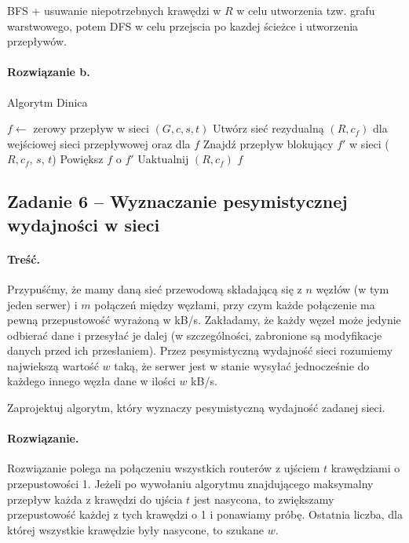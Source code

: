 BFS + usuwanie niepotrzebnych krawędzi w $R$ w celu utworzenia tzw. 
grafu warstwowego, potem DFS w celu przejscia po kazdej ścieżce
i utworzenia przepływów.

\paragraph{Rozwiązanie b.}

\begin{algorithm}[H]
	\caption{Algorytm Dinica}
	\begin{algorithmic}[1]
		\State $f \gets$ zerowy przepływ w sieci $(G,c,s,t)$
		\State Utwórz sieć rezydualną $(R, c_f)$ dla wejściowej 
		sieci przepływowej oraz dla $f$ 
		\State Znajdź przepływ blokujący $f'$ w sieci ($R, c_f$, $s$, $t$)
		\State Powiększ $f$ o $f'$
		\State Uaktualnij $(R, c_f)$
		\EndWhile
		\State \Return $f$
		\EndProcedure
	\end{algorithmic}
	\label{alg:dinic}
\end{algorithm}

\subsection{Zadanie 6 -- Wyznaczanie pesymistycznej wydajności w sieci}
\paragraph{Treść.} Przypuśćmy, że mamy daną sieć przewodową składającą 
się z $n$ węzłów (w tym jeden serwer) i $m$
połączeń między węzłami, przy czym każde połączenie ma pewną 
przepustowość wyrażoną w kB/s. Zakładamy, że
każdy węzeł może jedynie odbierać dane i przesyłać je 
dalej (w szczególności, zabronione są modyfikacje danych przed
ich przesłaniem). Przez pesymistyczną wydajność sieci 
rozumiemy najwiekszą wartość $w$ taką, że serwer jest w stanie
wysyłać jednocześnie do każdego innego węzła dane w ilości $w$ kB/s.

Zaprojektuj algorytm, który wyznaczy pesymistyczną wydajność zadanej sieci.

\paragraph{Rozwiązanie.}
Rozwiązanie polega na połączeniu wszystkich routerów z ujściem $t$ krawędziami 
o przepustowości 1. Jeżeli po wywołaniu algorytmu znajdującego maksymalny
przepływ każda z krawędzi do ujścia $t$ jest nasycona, to 
zwiększamy przepustowość każdej z tych krawędzi o 1 i ponawiamy próbę.
Ostatnia liczba, dla której wszystkie krawędzie były nasycone, to 
szukane $w$.


